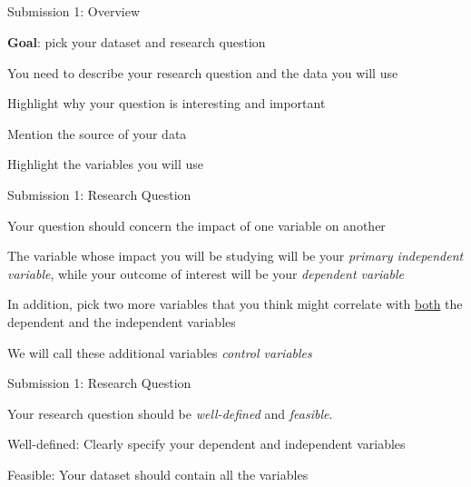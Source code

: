 \documentclass{./../Lectures/div_teaching_slides}
\begin{document}
\subsection{\vspace{1em}}

\begin{frame}{Submission 1: Overview}
\begin{witemize}
  \item \textbf{Goal}: pick your dataset and research question
  \item You need to describe your research question and the data you will use
  \item Highlight why your question is interesting and important
  \item Mention the source of your data
  \item Highlight the variables you will use
\end{witemize}
\end{frame}

\begin{frame}{Submission 1: Research Question}
\begin{witemize}
\item Your question should concern the impact of one variable on another 
\item The variable whose impact you will be studying will be your \textit{primary independent variable}, while your outcome of interest will be your \textit{dependent variable}
\item In addition, pick two more variables that you think might correlate with \underline{both} the dependent and the independent variables
\item We will call these additional variables \textit{control variables}
\end{witemize}
\end{frame}

\begin{frame}{Submission 1: Research Question}
\begin{center}
\end{center} 
\vspace{0.5em}
Your research question should be \textit{well-defined} and \textit{feasible}. \\
\begin{witemize}
	\item Well-defined: Clearly specify your dependent and independent variables
	\item Feasible: Your dataset should contain all the variables
\end{witemize}
\end{frame}
\end{document}
